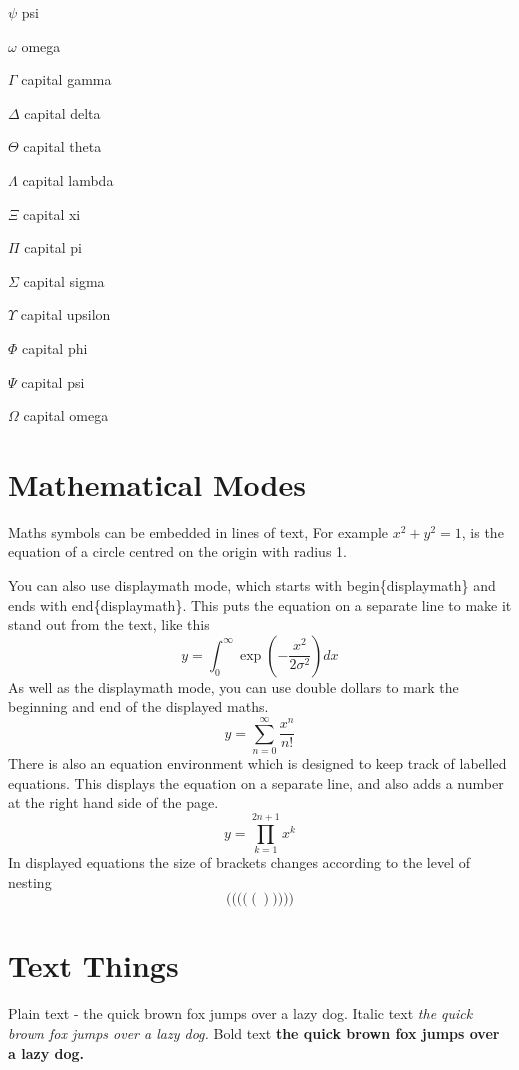 \documentclass[a4paper]{article}
\begin{document}
$\psi$ psi 

$\omega$ omega 

$ \Gamma$ capital gamma 

$\Delta$ capital delta

$\Theta$ capital theta

$\Lambda$ capital lambda

$\Xi$ capital xi

$\Pi$ capital pi

$\Sigma$ capital sigma

$\Upsilon$ capital upsilon

$\Phi$ capital phi

$\Psi$ capital psi

$\Omega$ capital omega

\section{Mathematical Modes} 

Maths symbols can be embedded in lines of text, For example $x^2 + y^2
= 1$, is the equation of a circle centred on the origin with radius 1.

You can also use displaymath mode, which starts with
begin\{displaymath\} and ends with end\{displaymath\}. This puts the
equation on a separate line to make it stand out from the text, like
this
\begin{displaymath} 
y = \int_0^\infty \exp\left(-\frac{x^2}{2 \sigma^2} \right) dx 
\end{displaymath} 
As well as the displaymath mode, you can use double dollars to mark 
the beginning and end of the displayed maths. 
$$ 
y = \sum_{n=0}^\infty \frac{x^n}{n!}
$$
There is also an equation environment which is designed to keep track
of labelled equations. This displays the equation on a separate
line, and also adds a number at the right hand side of the page. 
\begin{equation} 
y = \prod_{k=1}^{2n+1} x^k 
\end{equation} 
In displayed equations the size of brackets changes according to the
level of nesting 
$$\Bigg( \bigg( \Big( \big( ( ) \big) \Big) \bigg) \Bigg) $$ 


\section{Text Things} 

Plain text - the quick brown fox jumps over a lazy dog. Italic text
{\it the quick brown fox jumps over a lazy dog.} Bold text {\bf the
quick brown fox jumps over a lazy dog.}
\end{document}
